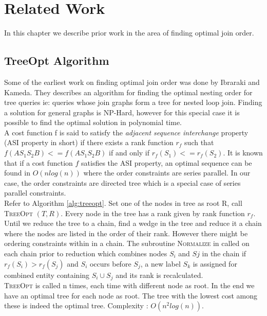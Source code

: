 \chapter{Related Work}
In this chapter we describe prior work in the area of finding optimal join order.

\section{TreeOpt Algorithm}
Some of the earliest work on finding optimal join order was done by Ibraraki and Kameda\cite{ibaraki1984optimal}.  They describes an algorithm for finding the optimal nesting order for tree queries ie: queries whose join graphs form a tree for nested loop join. Finding a solution for general graphs is NP-Hard, however for this special case it is possible to find the optimal solution in polynomial time. \\

A cost function f is said to satisfy the \textit{adjacent sequence interchange} property (ASI property in short) if there exists a rank function $r_{f}$ such that $f(AS_{1}S_{2}B) <= f(AS_{1}S_{2}B)$ if and only if $r_{f}(S_{1}) <= r_{f}(S_{2})$. It is known that if a cost function $f$ satisfies the ASI property, an optimal sequence can be found in $O(n log(n))$ where the order constraints are series parallel. In our case, the order constraints are directed tree which is a special case of series parallel constraints. \\

Refer to Algorithm \ref{alg:treeopt}. Set one of the nodes in tree as root R, call \textsc{TreeOpt} $(T,R)$. Every node in the tree has a rank given by rank function $r_{f}$. Until we reduce the tree to a chain, find a wedge in the tree and reduce it a chain where the nodes are listed in the order of their rank. However there might be ordering constraints within in a chain. The subroutine \textsc{Normalize} in called on each chain prior to reduction which combines nodes $S_{i}$ and $S{j}$ in the chain if $r_{f}(S_{i}) > r_{f}(S_{j})$ and $S_{i}$ occurs before $S_{j}$, a new label $S_{k}$ is assigned for combined entity containing $S_{i} \cup S_{j}$ and its rank is recalculated.  \\

\textsc{TreeOpt} is called n times, each time with different node as root. In the end we have an optimal tree for each node as root. The tree with the lowest cost among these is  indeed the optimal tree. Complexity : $O(n^2 log(n))$.

